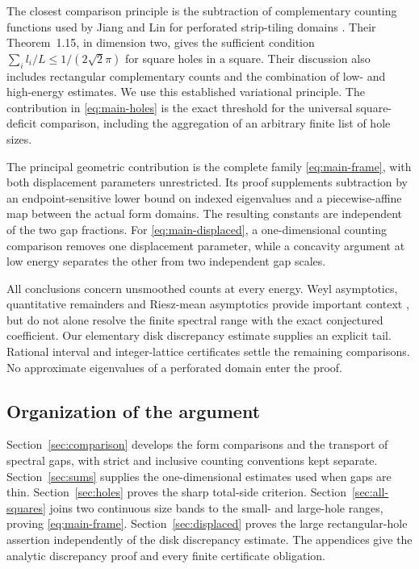 \documentclass[11pt,reqno]{amsart}
\numberwithin{equation}{section}
\begin{document}
The closest comparison principle is the subtraction of
complementary counting functions used by Jiang and Lin for
perforated strip-tiling domains \cite{JL2026}. Their
Theorem~1.15, in dimension two, gives the sufficient condition
$\sum_i l_i/L\le1/(2\sqrt2\pi)$ for square holes in a square.
Their discussion also includes rectangular complementary counts
and the combination of low- and high-energy estimates. We use
this established variational principle. The contribution in
\eqref{eq:main-holes} is the exact threshold for the universal
square-deficit comparison, including the aggregation of an
arbitrary finite list of hole sizes.

The principal geometric contribution is the complete family
\eqref{eq:main-frame}, with both displacement parameters
unrestricted. Its proof supplements subtraction by an
endpoint-sensitive lower bound on indexed eigenvalues and a
piecewise-affine map between the actual form domains. The
resulting constants are independent of the two gap fractions.
For \eqref{eq:main-displaced}, a one-dimensional counting
comparison removes one displacement parameter, while a concavity
argument at low energy separates the other from two independent
gap scales.

All conclusions concern unsmoothed counts at every energy.
Weyl asymptotics, quantitative remainders and Riesz-mean
asymptotics provide important context
\cite{Weyl1912,JL2026,FrankLarson2025}, but do not alone resolve
the finite spectral range with the exact conjectured coefficient.
Our elementary disk discrepancy estimate supplies an explicit
tail. Rational interval and integer-lattice certificates settle
the remaining comparisons. No approximate eigenvalues of a
perforated domain enter the proof.

\subsection*{Organization of the argument}

Section~\ref{sec:comparison} develops the form comparisons and
the transport of spectral gaps, with strict and inclusive counting
conventions kept separate. Section~\ref{sec:sums} supplies the
one-dimensional estimates used when gaps are thin.
Section~\ref{sec:holes} proves the sharp total-side criterion.
Section~\ref{sec:all-squares} joins two continuous size bands to
the small- and large-hole ranges, proving
\eqref{eq:main-frame}. Section~\ref{sec:displaced} proves the
large rectangular-hole assertion independently of the disk
discrepancy estimate. The appendices give the analytic discrepancy
proof and every finite certificate obligation.
\end{document}
